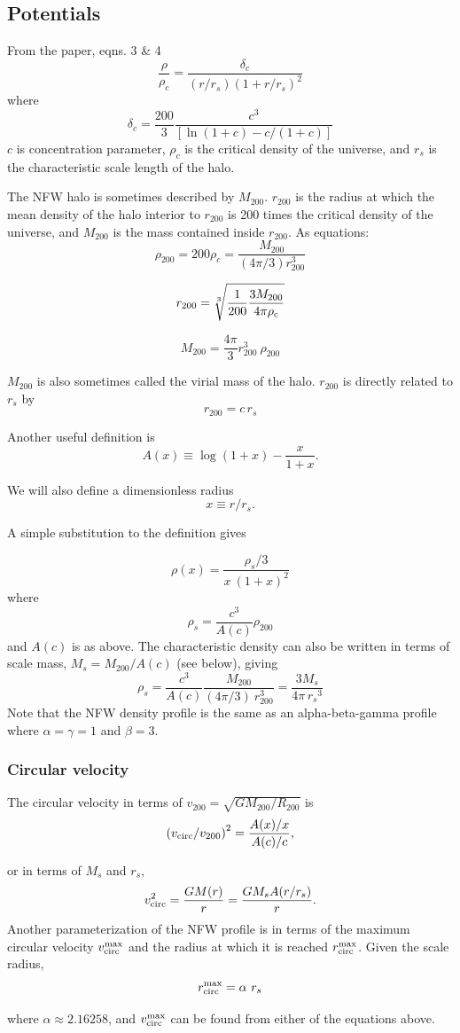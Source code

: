 \subsection{Potentials}\label{potentials}

From the \citet{nfw1996} paper, eqns. 3 \& 4 \[
\frac{\rho}{\rho_c} = \frac{\delta_c}{(r/r_s)(1+r/r_s)^2}
\] where \[
\delta_c = \frac{200}{3}\frac{c^3}{[\ln(1+c)-c/(1+c)]}
\] \(c\) is concentration parameter, \(\rho_c\) is the critical density
of the universe, and \(r_s\) is the characteristic scale length of the
halo.

The NFW halo is sometimes described by \(M_{200}\). \(r_{200}\) is the
radius at which the mean density of the halo interior to \(r_{200}\) is
200 times the critical density of the universe, and \(M_{200}\) is the
mass contained inside \(r_{200}\). As equations: \[
\rho_{200} = 200\rho_{c} = \frac{M_{200}}{(4\pi/3) r_{200}^3}
\]

\[
r_{200} = \sqrt[3]{\frac{1}{200}\frac{3M_{200}}{4\pi \rho_{\rm c
}}}
\]

\[
M_{200} = \frac{4\pi}{3} r_{200}^3\ \rho_{200}
\]

\(M_{200}\) is also sometimes called the virial mass of the halo.
\(r_{200}\) is directly related to \(r_s\) by \[
r_{200} = c\,r_s
\]

Another useful definition is \[
A(x) \equiv \log (1+x) - \frac{x}{1+x}.
\]

We will also define a dimensionless radius \[
x \equiv r/r_s.
\]

A simple substitution to the definition gives

\[
\rho(x) =  \frac{\rho_s/3}{x\ (1+x)^2}
\] where \[
\rho_s = \frac{c^3}{A(c)} \rho_{200}
\] and \(A(c)\) is as above. The characteristic density can also be
written in terms of scale mass, \(M_s = M_{200}/{A(c)}\) (see below),
giving \[
\rho_s = \frac{c^3}{A(c)} \frac{M_{200}}{(4\pi/3)\ r_{200}^3}  = \frac{3M_s}{4\pi\, {r_s}^3}
\] Note that the NFW density profile is the same as an alpha-beta-gamma
profile where \(\alpha=\gamma=1\) and \(\beta =3\).

\subsubsection{Circular velocity}\label{circular-velocity}

The circular velocity in terms of
\(v_{200} = \sqrt{G M_{200} / R_{200}}\) is \[
\left(v_{\rm circ}/v_{200}\right)^2 = \frac{A(x)/x}{A(c)/c},
\]

or in terms of \(M_s\) and \(r_s\), \[
v_{\rm circ}^2 = \frac{G M(r)}{r} = \frac{G M_s A(r/r_s)}{r}.
\] Another parameterization of the NFW profile is in terms of the
maximum circular velocity \(v_{\rm circ}^{\rm max}\) and the radius at
which it is reached \(r_{\rm circ}^{\rm max}\). Given the scale radius,
\[
r_{\rm circ}^{\rm max} = \alpha\ r_s
\]

where \(\alpha\approx2.16258\), and \(v_{\rm circ}^{\rm max}\) can be
found from either of the equations above.
